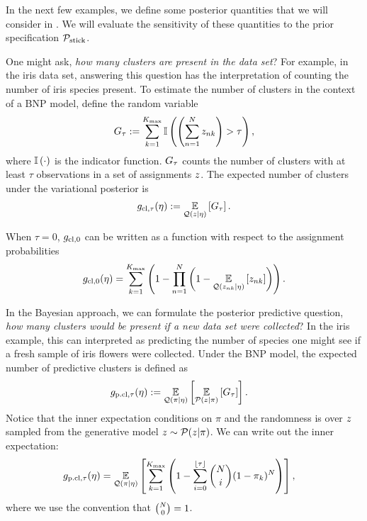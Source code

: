 In the next few examples, we define some posterior quantities that we will
consider in . We will evaluate the sensitivity
of these quantities to the prior specification $\mathcal{P}_{\mathrm{stick}}$.

\begin{ex}

One might ask, \textit{how many clusters are present in the data set}?
For example, in the iris data set, answering this question has the interpretation
of counting the number of iris species present.
To estimate the number of clusters in the context of a BNP model,
define the random variable
\begin{align*}
  G_\tau := \sum_{k=1}^{K_{\mathrm{max}}} \mathbb{I}\left( \left(\sum_{n=1}^{N}
  z_{nk}\right) > \tau\right),
\end{align*}
where $\mathbb{I}\left(\cdot\right)$ is the indicator function.
$G_\tau$ counts the number of clusters with at least $\tau$
observations in a set of assignments $z$.
The expected number of clusters under the variational posterior is
\begin{align*}
  g_{\text{cl},\tau}(\eta) := \underset{\mathcal{Q}(z\vert\eta)}{\mathbb{E}}\left[G_\tau\right].
\end{align*}

When $\tau = 0$, $g_{\text{cl},0}$ can be written as a function with respect to
the assignment probabilities
\begin{align*}
  g_{\text{cl},0}(\eta) = \sum_{k=1}^{K_{\mathrm{max}}} \left(1 -  \prod_{n=1}^N
  \left(1 - \underset{\mathcal{Q}(z_{nk}\vert\eta)}{\mathbb{E}}\left[z_{nk}\right]\right)\right).
\end{align*}
%
\end{ex}

\begin{ex}

In the Bayesian approach, we can formulate the posterior predictive question,
\textit{how many clusters would be present if a new data set were collected}?
In the iris example, this can interpreted as predicting the number of species
one might see if a fresh sample of iris flowers were collected.
Under the BNP model, the expected number of predictive clusters is defined as
\begin{align*}
  g_{\text{p.cl},\tau}(\eta) &:= \underset{\mathcal{Q}(\pi\vert\eta)}{\mathbb{E}}\left[\underset{\mathcal{P}(z\vert\pi)}{\mathbb{E}}\left[G_\tau\right]\right].
\end{align*}
Notice that the inner expectation conditions on $\pi$ and the randomness is
over $z$ sampled from the generative model $z\sim\mathcal{P}(z\vert\pi)$.
We can write out the inner expectation:
%
\begin{align*}
  g_{\text{p.cl},\tau}(\eta) &= \underset{\mathcal{Q}(\pi\vert\eta)}{\mathbb{E}}\left[\sum_{k=1}^{K_{\mathrm{max}}}\left(1 -
  \sum_{i=0}^{\lfloor\tau\rfloor} {N \choose i} (1 - \pi_k)^N \right)\right],
\end{align*}
where we use the convention that ${N\choose 0} = 1$.
%
\end{ex}

